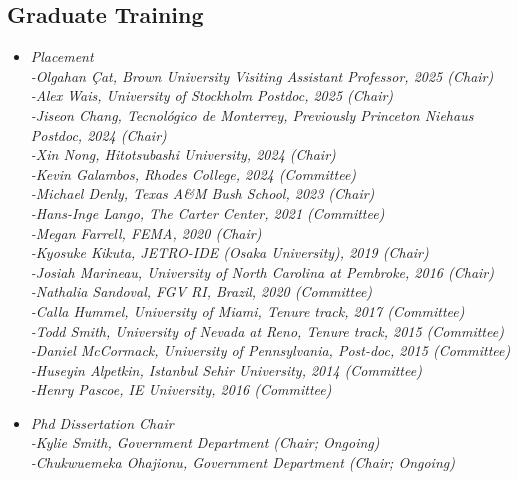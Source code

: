 \documentclass[10pt]{article}
\begin{document}
\subsection*{Graduate Training}
\begin{itemize}\setlength{\itemsep}{1pt}

\item \emph{Placement}
\\ \indent \textit{-Olgahan \c{C}at, Brown University Visiting Assistant Professor, 2025 (Chair)}
\\ \indent \textit{-Alex Wais, University of Stockholm Postdoc, 2025 (Chair)}
\\ \indent \textit{-Jiseon Chang, Tecnol\'ogico de Monterrey, Previously Princeton Niehaus Postdoc, 2024 (Chair)}
\\ \indent \textit{-Xin Nong, Hitotsubashi University, 2024 (Chair)}
\\ \indent \textit{-Kevin Galambos, Rhodes College, 2024 (Committee)}
\\ \indent \textit{-Michael Denly, Texas A\&M Bush School, 2023 (Chair)}
\\ \indent \textit{-Hans-Inge Lango, The Carter Center, 2021 (Committee)}
\\ \indent \textit{-Megan Farrell, FEMA, 2020 (Chair)}
\\ \indent \textit{-Kyosuke Kikuta, JETRO-IDE (Osaka University), 2019 (Chair)}
\\ \indent \textit{-Josiah Marineau, University of North Carolina at Pembroke, 2016 (Chair) }
\\ \indent \textit{-Nathalia Sandoval, FGV RI, Brazil, 2020 (Committee)}
\\ \indent \textit{-Calla Hummel, University of Miami, Tenure track, 2017 (Committee)}
\\ \indent \textit{-Todd Smith, University of Nevada at Reno, Tenure track, 2015 (Committee)}
\\ \indent \textit{-Daniel McCormack, University of Pennsylvania, Post-doc, 2015 (Committee)}
\\ \indent \textit{-Huseyin Alpetkin, Istanbul Sehir University, 2014 (Committee)}
\\ \indent \textit{-Henry Pascoe, IE University, 2016 (Committee)}


\item \emph{Phd Dissertation Chair}
\\ \indent \textit{-Kylie Smith, Government Department (Chair; Ongoing)}
\\ \indent \textit{-Chukwuemeka Ohajionu, Government Department (Chair; Ongoing)}


\end{itemize}
\end{document}
